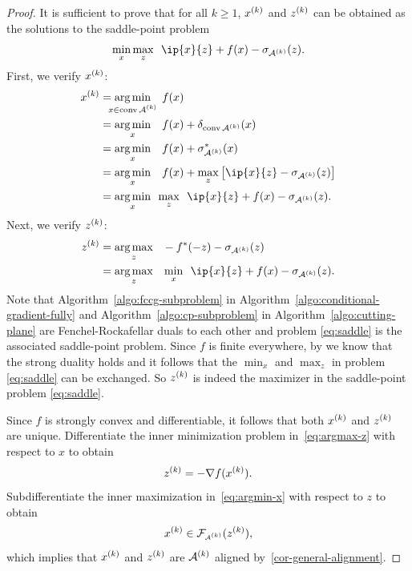 \begin{proof}
  It is sufficient to prove that for all $k\geq1$, $x^{(k)}$ and $z^{(k)}$ can be
  obtained as the solutions to the saddle-point problem
  \begin{equation} \label{eq:saddle}
    \min_{x}\max_{z}\enspace \ip{x}{z} + f(x) -  \sigma_{\Ascr\k}(z).
  \end{equation}
  First, we verify $x^{(k)}$:
  \begin{align}
  x\k &= \argmin{\mathclap{x \in \conv\Ascr\k}}\enspace f(x)\nonumber
      \\&= \argmin{x}\enspace f(x) + \delta_{\conv\Ascr\k}(x)\nonumber
      \\&= \argmin{x}\enspace f(x) + \sigma_{\Ascr\k}^*(x)\nonumber
      \\&= \argmin{x}\enspace f(x) + \max_{z}\big[\ip{x}{z} - \sigma_{\Ascr\k}(z)\big]\nonumber
      \\&= \argmin{x} \max_{z}\enspace\ip{x}{z} + f(x) - \sigma_{\Ascr\k}(z)\label{eq:argmin-x}.
  \end{align}
  Next, we verify $z^{(k)}$:
  \begin{align}
  z\k
      &=\argmax{z}\ -f^*(-z) - \sigma_{\Ascr\k}(z)\nonumber
    \\&=\argmax{z}\ \min_{x} \enspace \ip{x}{z} + f(x) - \sigma_{\Ascr\k}(z)\label{eq:argmax-z}.
  \end{align}
  Note that Algorithm~\ref{algo:fccg-subproblem} in Algorithm~\ref{algo:conditional-gradient-fully} and Algorithm~\ref{algo:cp-subproblem} in Algorithm~\ref{algo:cutting-plane} are Fenchel-Rockafellar duals to each other and problem \eqref{eq:saddle} is the associated saddle-point problem. Since $f$ is finite everywhere, by \cite[Theorem~31.1]{rockafellar1970convex} we know that the strong duality holds and it follows that the $\min_x$ and $\max_z$ in problem \eqref{eq:saddle} can be exchanged. So $z^{(k)}$ is indeed the maximizer in the saddle-point problem \eqref{eq:saddle}. 

  Since $f$ is strongly convex and differentiable, it follows that both $x^{(k)}$ and $z^{(k)}$ are unique. Differentiate the inner minimization problem in~\eqref{eq:argmax-z} with
  respect to $x$ to obtain 
  \[z^{(k)} = -\nabla f(x^{(k)}).\]
  Subdifferentiate the inner maximization in~\eqref{eq:argmin-x} with respect to $z$ to obtain
  \[x^{(k)} \in \mathcal{F}_{\scriptscriptstyle \mathcal{A}^{(k)}}(z^{(k)}),\] which implies that $x^{(k)}$ and $z^{(k)}$
  are $\mathcal{A}^{(k)}$ aligned by~\autoref{cor-general-alignment}. 
\end{proof} 


